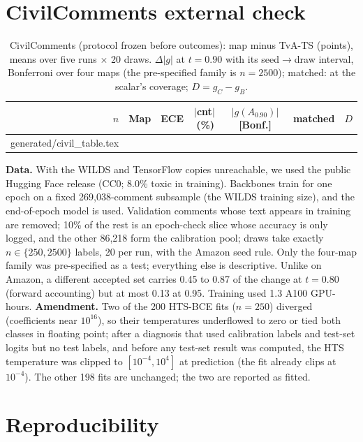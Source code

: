 \documentclass[sigconf,anonymous,review]{acmart}
\makeatletter
\newcommand{\tablerows}[1]{\@@input #1.tex }
\makeatother
\begin{document}
\section{CivilComments external check}
\label{app:civil}
\begin{table}[t]
\centering\footnotesize
\setlength{\tabcolsep}{2.2pt}
\caption{CivilComments (protocol frozen before outcomes): map minus
TvA-TS (points), means over five runs $\times$ 20 draws. $\Delta|g|$ at
$t{=}0.90$ with its seed$\to$draw interval, Bonferroni over four maps (the
pre-specified family is $n{=}2500$); matched: at the scalar's coverage;
$D=g_C-g_B$.}
\label{tab:civil}
\begin{tabular}{rlccccc}
\toprule
$n$ & Map & ECE & $|$cnt$|$\,(\%) & $|g(A_{0.90})|$ [Bonf.] & matched & $D$\\
\midrule
\tablerows{generated/civil_table}
\bottomrule
\end{tabular}
\end{table}
\textbf{Data.} With the WILDS and TensorFlow copies unreachable, we used the public
Hugging Face release (CC0; 8.0\% toxic in training). Backbones train for
one epoch on a fixed 269{,}038-comment subsample (the WILDS training
size), and the end-of-epoch model is used. Validation comments whose text appears in training are
removed; 10\% of the rest is an epoch-check slice whose accuracy is only
logged, and the other 86{,}218 form the calibration pool; draws take
exactly $n\in\{250,2500\}$ labels, 20 per run, with the Amazon seed rule.
Only the four-map family was pre-specified as a test; everything else is
descriptive. Unlike on Amazon, a different accepted set carries 0.45 to
0.87 of the change at $t{=}0.80$ (forward accounting) but at most 0.13 at
0.95. Training used 1.3 A100 GPU-hours. \textbf{Amendment.} Two of the 200 HTS-BCE fits ($n{=}250$) diverged
(coefficients near $10^{16}$), so their temperatures underflowed to zero
or tied both classes in floating point; after a diagnosis that used calibration labels and test-set logits but
no test labels, and before any test-set result was computed, the HTS
temperature was clipped to $[10^{-4},10^4]$ at prediction (the fit
already clips at $10^{-4}$). The other 198 fits are unchanged; the two are
reported as fitted.

\section{Reproducibility}
\label{app:repro}
\end{document}

